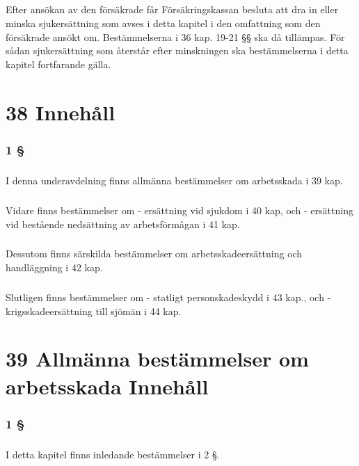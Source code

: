 \documentclass[a4paper,notitlepage,openany,10pt]{book}
\begin{document}
\paragraph*{}
Efter ansökan av den försäkrade får Försäkringskassan besluta att dra in eller minska sjukersättning som avses i detta kapitel i den omfattning som den försäkrade ansökt om.
Bestämmelserna i 36 kap. 19-21 §§ ska då tillämpas. För sådan sjukersättning som återstår efter minskningen ska bestämmelserna i detta kapitel fortfarande gälla.
\chapter*{38 Innehåll}
\subsection*{1 §}
\paragraph*{}
I denna underavdelning finns allmänna bestämmelser om arbetsskada i 39 kap.
\paragraph*{}
Vidare finns bestämmelser om
\newline - ersättning vid sjukdom i 40 kap, och
\newline - ersättning vid bestående nedsättning av arbetsförmågan i 41 kap.
\paragraph*{}
Dessutom finns särskilda bestämmelser om arbetsskadeersättning och handläggning i 42 kap.
\paragraph*{}
Slutligen finns bestämmelser om
\newline - statligt personskadeskydd i 43 kap., och
\newline - krigsskadeersättning till sjömän i 44 kap.
\chapter*{39 Allmänna bestämmelser om arbetsskada Innehåll}
\subsection*{1 §}
\paragraph*{}
I detta kapitel finns inledande bestämmelser i 2 §.
\end{document}
